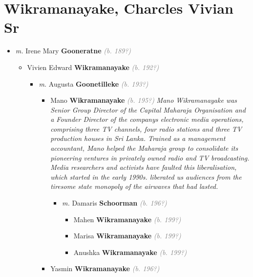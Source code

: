 \documentclass[10pt, openany]{book}
\begin{document}
\chapter{Wikramanayake, Charcles Vivian Sr}
\label{00003938}
\textcolor{slmaroon}{\textit{}}
\begin{itemize}
\item{\textit{m.} Irene Mary \textbf{Gooneratne} \textcolor{gray}{\textit{(b. 189?)}}   \label{couple:00003938:00003939} \begin{itemize}
\item{Vivien Edward \textbf{Wikramanayake} \textcolor{gray}{\textit{(b. 192?)}}
\begin{itemize}
\item{\textit{m.} Augusta \textbf{Goonetilleke} \textcolor{gray}{\textit{(b. 193?)}}   \label{couple:00003940:00003941} \begin{itemize}
\item{Mano \textbf{Wikramanayake} \textcolor{gray}{\textit{(b. 195?)}} \textcolor{slmaroon}{\textit{Mano Wikramanayake was Senior Group Director of the Capital Maharaja Organisation and a Founder Director of the companys electronic media operations, comprising three TV channels, four radio stations and three TV production houses in Sri Lanka. Trained as a management accountant, Mano helped the Maharaja group to consolidate its pioneering ventures in privately owned radio and TV broadcasting. Media researchers and activists have faulted this liberalisation, which started in the early 1990s. liberated us audiences from the tiresome state monopoly of the airwaves that had lasted.}}
\begin{itemize}
\item{\textit{m.} Damaris \textbf{Schoorman} \textcolor{gray}{\textit{(b. 196?)}}   \label{couple:00003942:00003943} \begin{itemize}
\item{Mahen \textbf{Wikramanayake} \textcolor{gray}{\textit{(b. 199?)}}
 }
\item{Marisa \textbf{Wikramanayake} \textcolor{gray}{\textit{(b. 199?)}}
 }
\item{Anushka \textbf{Wikramanayake} \textcolor{gray}{\textit{(b. 199?)}}
 }
\end{itemize}}
\end{itemize}
 }
\item{Yasmin \textbf{Wikramanayake} \textcolor{gray}{\textit{(b. 196?)}}
}
\end{itemize}}
\end{itemize}}
\end{itemize}}
\end{itemize}
\end{document}
